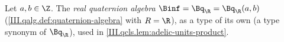 Let $a,b\in\Z$. The \emph{real quaternion algebra} $\Binf=\Bq_\R=\Bq_\R(a,b)$ (\cref{III.qalg.def:quaternion-algebra} with $R=\R$), as a type of its own
(a type synonym of $\Bq_\R$), used in \cref{III.qcls.lem:adelic-units-product}.
